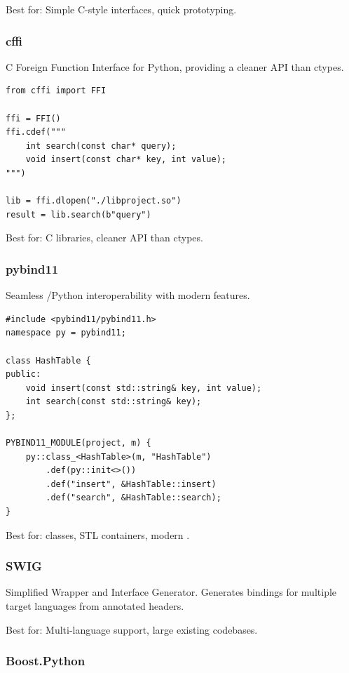 Best for: Simple C-style interfaces, quick prototyping.

\subsubsection{cffi}

C Foreign Function Interface for Python, providing a cleaner API than ctypes.

\begin{lstlisting}[style=python]
from cffi import FFI

ffi = FFI()
ffi.cdef("""
    int search(const char* query);
    void insert(const char* key, int value);
""")

lib = ffi.dlopen("./libproject.so")
result = lib.search(b"query")
\end{lstlisting}

Best for: C libraries, cleaner API than ctypes.

\subsubsection{pybind11}

Seamless \cpp{}/Python interoperability with modern \cpp{} features.

\begin{lstlisting}[style=cpp]
#include <pybind11/pybind11.h>
namespace py = pybind11;

class HashTable {
public:
    void insert(const std::string& key, int value);
    int search(const std::string& key);
};

PYBIND11_MODULE(project, m) {
    py::class_<HashTable>(m, "HashTable")
        .def(py::init<>())
        .def("insert", &HashTable::insert)
        .def("search", &HashTable::search);
}
\end{lstlisting}

Best for: \cpp{} classes, STL containers, modern \cpp{}.

\subsubsection{SWIG}

Simplified Wrapper and Interface Generator. Generates bindings for multiple target languages from annotated \cpp{} headers.

Best for: Multi-language support, large existing codebases.

\subsubsection{Boost.Python}

